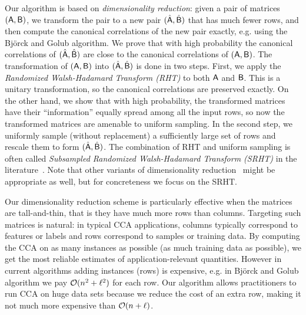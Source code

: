 Our algorithm is based on \emph{dimensionality reduction}: given a pair of matrices $({\mathsf{A} }, {\mathsf{B} })$, we transform the pair to a new pair
$(\hat{{\mathsf{A} }}, \hat{{\mathsf{B} }})$ that has much fewer rows, and then compute the canonical correlations of the new pair exactly, e.g. using the Bj{\"o}rck and Golub algorithm. We prove that with high probability the canonical correlations of $(\hat{{\mathsf{A} }}, \hat{{\mathsf{B} }})$ are close to the canonical correlations of $({\mathsf{A} }, {\mathsf{B} })$.
The transformation of $({\mathsf{A} }, {\mathsf{B} })$ into $(\hat{{\mathsf{A} }}, \hat{{\mathsf{B} }})$ is done in two steps. First, we apply the \emph{Randomized Walsh-Hadamard Transform (RHT)} to both ${\mathsf{A} }$ and ${\mathsf{B} }$. This is a unitary transformation, so the canonical correlations are preserved exactly. On the other hand, we show that with high probability, the transformed matrices have their ``information'' equally spread among all the input rows, so now the transformed matrices are amenable to uniform sampling. In the second step, we uniformly sample (without replacement) a sufficiently large set of rows and rescale them to form $(\hat{{\mathsf{A} }}, \hat{{\mathsf{B} }})$. The combination of RHT and uniform sampling is often called \emph{Subsampled Randomized Walsh-Hadamard Transform (SRHT)} in the literature~\cite{Tro11}. Note that
other variants of dimensionality reduction~\cite{sarlos} might be appropriate as well, but for concreteness we focus on the SRHT.

Our dimensionality reduction scheme is particularly effective when the matrices are tall-and-thin, that is they have much more rows than columns. Targeting such matrices is natural: in typical CCA applications, columns typically correspond to features or labels and rows correspond to samples or training data. By computing the CCA on as many instances as possible (as much training data as possible), we get the most reliable estimates of application-relevant quantities.
However in current algorithms adding instances (rows) is expensive, e.g. in Bj{\"o}rck and Golub algorithm we pay $\mathcal{O}(n^2+\ell^2)$ for each row. Our algorithm allows practitioners to run CCA on huge data sets because we reduce the cost of an extra row, making it not much more expensive than $\mathcal{O}(n+\ell)$.
%
%
